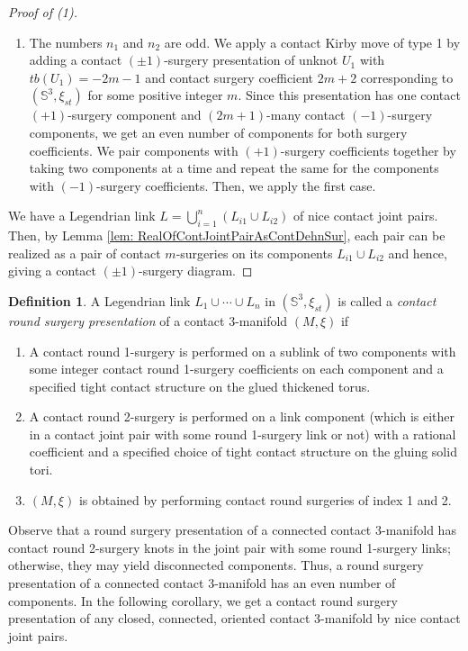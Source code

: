 \documentclass{amsart}
\theoremstyle{plain}
\theoremstyle{remark}
\theoremstyle{definition}
\newtheorem{defn}{Definition}
\newcommand{\s}{\mathbb{S}}
\begin{document}
\begin{proof}[Proof of (1)]
\begin{enumerate}
        \item The numbers $n_1$ and $n_2$ are odd. 
        We apply a contact Kirby move of type 1 by adding a contact $(\pm1)$-surgery presentation of unknot $U_1$ with $tb(U_1)=-2m-1$ and contact surgery coefficient $2m+2$ corresponding to $\left(\s^3, \xi_{st}\right)$ for some positive integer $m$.
        Since this presentation has one contact $(+1)$-surgery component and $(2m+1)$-many contact $(-1)$-surgery components, we get an even number of components for both surgery coefficients. 
        We pair components with $(+1)$-surgery coefficients together by taking two components at a time and repeat the same for the components with $(-1)$-surgery coefficients.
        Then, we apply the first case.
    \end{enumerate}
   
 We have a Legendrian link $L = \bigcup_{i=1}^{n}(L_{i1} \cup L_{i2})$ of nice contact joint pairs. 
    Then, by Lemma \ref{lem: RealOfContJointPairAsContDehnSur}, each pair can be realized as a pair of contact $m$-surgeries on its components $L_{i1}\cup L_{i2}$ and hence, giving a contact $(\pm1)$-surgery diagram.
\end{proof}


\begin{defn}
    A Legendrian link $L_1 \cup \cdots \cup L_{n}$ in $\left(\s^3, \xi_{st}\right)$ is called a \textit{contact round surgery presentation} of a contact 3-manifold $(M, \xi)$ if 
    \begin{enumerate}
       \item A contact round 1-surgery is performed on a sublink of two components with some integer contact round 1-surgery coefficients on each component and a specified tight contact structure on the glued thickened torus.
        \item A contact round 2-surgery is performed on a link component (which is either in a contact joint pair with some round 1-surgery link or not) with a rational coefficient and a specified choice of tight contact structure on the gluing solid tori. 
        \item $(M, \xi)$ is obtained by performing contact round surgeries of index 1 and 2.
    \end{enumerate}
\end{defn}

Observe that a round surgery presentation of a connected contact 3-manifold has contact round 2-surgery knots in the joint pair with some round 1-surgery links; otherwise, they may yield disconnected components. 
Thus, a round surgery presentation of a connected contact 3-manifold has an even number of components. 
In the following corollary, we get a contact round surgery presentation of any closed, connected, oriented contact 3-manifold by nice contact joint pairs. 
\end{document}
